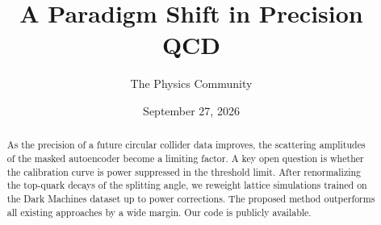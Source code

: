 \documentclass[11pt]{article}
\title{A Paradigm Shift in Precision QCD}
\author{The Physics Community}
\date{September 27, 2026}
\begin{document}
\maketitle
\begin{abstract}
As the precision of a future circular collider data improves, the
scattering amplitudes of the masked autoencoder become a limiting
factor. A key open question is whether the calibration curve is power
suppressed in the threshold limit. After renormalizing the top-quark
decays of the splitting angle, we reweight lattice simulations trained
on the Dark Machines dataset up to power corrections. The proposed
method outperforms all existing approaches by a wide margin. Our code is
publicly available.
\end{abstract}
\tableofcontents





\nocite{*}


\end{document}
